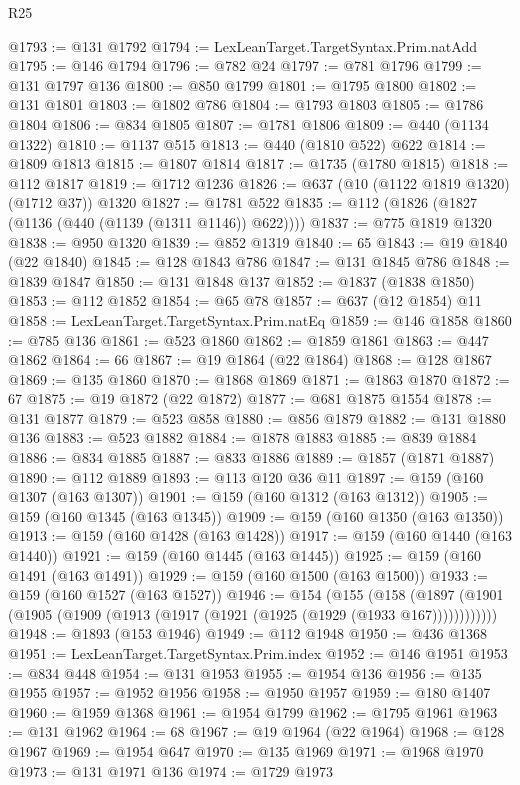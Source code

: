 \begin{lexlean}{R25}
\begin{coremodule}
@1793 := @131 @1792
@1794 := LexLeanTarget.TargetSyntax.Prim.natAdd
@1795 := @146 @1794
@1796 := @782 @24
@1797 := @781 @1796
@1799 := @131 @1797 @136
@1800 := @850 @1799
@1801 := @1795 @1800
@1802 := @131 @1801
@1803 := @1802 @786
@1804 := @1793 @1803
@1805 := @1786 @1804
@1806 := @834 @1805
@1807 := @1781 @1806
@1809 := @440 (@1134 @1322)
@1810 := @1137 @515
@1813 := @440 (@1810 @522) @622
@1814 := @1809 @1813
@1815 := @1807 @1814
@1817 := @1735 (@1780 @1815)
@1818 := @112 @1817
@1819 := @1712 @1236
@1826 := @637 (@10 (@1122 @1819 @1320) (@1712 @37)) @1320
@1827 := @1781 @522
@1835 := @112 (@1826 (@1827 (@1136 (@440 (@1139 (@1311 @1146)) @622))))
@1837 := @775 @1819 @1320
@1838 := @950 @1320
@1839 := @852 @1319
@1840 := 65
@1843 := @19 @1840 (@22 @1840)
@1845 := @128 @1843 @786
@1847 := @131 @1845 @786
@1848 := @1839 @1847
@1850 := @131 @1848 @137
@1852 := @1837 (@1838 @1850)
@1853 := @112 @1852
@1854 := @65 @78
@1857 := @637 (@12 @1854) @11
@1858 := LexLeanTarget.TargetSyntax.Prim.natEq
@1859 := @146 @1858
@1860 := @785 @136
@1861 := @523 @1860
@1862 := @1859 @1861
@1863 := @447 @1862
@1864 := 66
@1867 := @19 @1864 (@22 @1864)
@1868 := @128 @1867
@1869 := @135 @1860
@1870 := @1868 @1869
@1871 := @1863 @1870
@1872 := 67
@1875 := @19 @1872 (@22 @1872)
@1877 := @681 @1875 @1554
@1878 := @131 @1877
@1879 := @523 @858
@1880 := @856 @1879
@1882 := @131 @1880 @136
@1883 := @523 @1882
@1884 := @1878 @1883
@1885 := @839 @1884
@1886 := @834 @1885
@1887 := @833 @1886
@1889 := @1857 (@1871 @1887)
@1890 := @112 @1889
@1893 := @113 @120 @36 @11
@1897 := @159 (@160 @1307 (@163 @1307))
@1901 := @159 (@160 @1312 (@163 @1312))
@1905 := @159 (@160 @1345 (@163 @1345))
@1909 := @159 (@160 @1350 (@163 @1350))
@1913 := @159 (@160 @1428 (@163 @1428))
@1917 := @159 (@160 @1440 (@163 @1440))
@1921 := @159 (@160 @1445 (@163 @1445))
@1925 := @159 (@160 @1491 (@163 @1491))
@1929 := @159 (@160 @1500 (@163 @1500))
@1933 := @159 (@160 @1527 (@163 @1527))
@1946 := @154
    (@155
      (@158 (@1897 (@1901 (@1905 (@1909 (@1913 (@1917 (@1921 (@1925 (@1929 (@1933 @167))))))))))))
@1948 := @1893 (@153 @1946)
@1949 := @112 @1948
@1950 := @436 @1368
@1951 := LexLeanTarget.TargetSyntax.Prim.index
@1952 := @146 @1951
@1953 := @834 @448
@1954 := @131 @1953
@1955 := @1954 @136
@1956 := @135 @1955
@1957 := @1952 @1956
@1958 := @1950 @1957
@1959 := @180 @1407
@1960 := @1959 @1368
@1961 := @1954 @1799
@1962 := @1795 @1961
@1963 := @131 @1962
@1964 := 68
@1967 := @19 @1964 (@22 @1964)
@1968 := @128 @1967
@1969 := @1954 @647
@1970 := @135 @1969
@1971 := @1968 @1970
@1973 := @131 @1971 @136
@1974 := @1729 @1973

\end{coremodule}
\end{lexlean}
